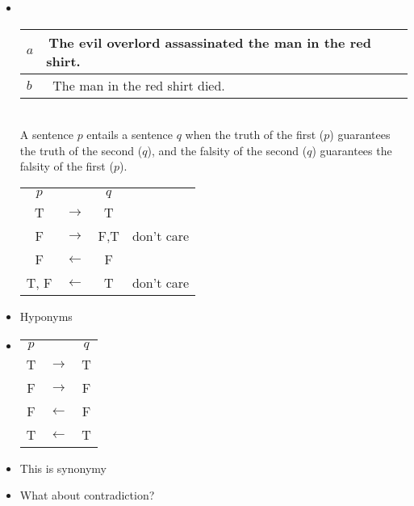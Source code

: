 \documentclass[headrule,footrule]{foils}
\begin{document}
\begin{itemize}
\item {} \\[2ex]
  \begin{tabular}{ll}
    $a$ & The evil overlord  assassinated the man in the red shirt. \\ \hline
    $b$ &  The man  in the red shirt died.
  \end{tabular}
  \\[2ex]
  A sentence $p$ entails a sentence $q$ when the truth of the first ($p$)
  guarantees the truth of the second ($q$), and the falsity of the
  second ($q$) guarantees the falsity of the first ($p$).
\begin{center}
  \begin{tabular}{|c|c|c|l}
    \cline{1-3}
    $p$ &  & $q$   \\
    \cline{1-3}
    T & $\rightarrow$  & T  \\ 
    F & $\rightarrow$  & F,T & don't care\\ 
    F & $\leftarrow$  & F  \\ 
    T, F & $\leftarrow$  & T  & don't care\\ 
    \cline{1-3}
  \end{tabular}
\end{center}
\end{itemize}

\begin{itemize}
\item Hyponyms
  \begin{exe}
    \ex {}
    \ex {}
  \end{exe}
\end{itemize}
\begin{itemize}
\item 
  \begin{exe}
    \ex {}
    \ex {}
  \end{exe}
\begin{center}
  \begin{tabular}{|c|c|c|}
    \cline{1-3}
    $p$ &  & $q$   \\
    \cline{1-3}
    T & $\rightarrow$  & T  \\ 
    F & $\rightarrow$  & F \\ 
    F & $\leftarrow$  & F  \\ 
    T & $\leftarrow$  & T  \\ 
    \cline{1-3}
  \end{tabular}
\end{center}
\item This is synonymy
\item What about contradiction?
\end{itemize}
\end{document}

